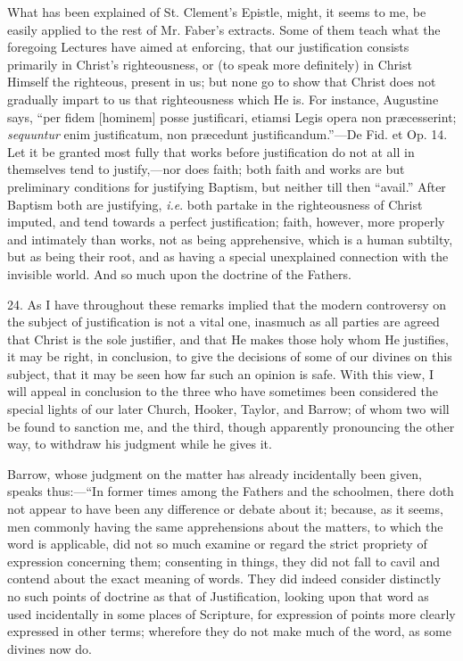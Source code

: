 What has been explained of St. Clement's Epistle, might, it seems
to me, be easily applied to the rest of Mr. Faber's extracts. Some of
them teach what the foregoing Lectures have aimed at enforcing, that
our justification consists primarily in Christ's righteousness, or (to
speak more definitely) in Christ Himself the righteous, present in us;
but none go to show that Christ does not gradually impart to us that
righteousness which He is. For instance, Augustine says, ``per
fidem [hominem] posse justificari, etiamsi Legis opera non
præcesserint; \emph{sequuntur} enim justificatum, non præcedunt
justificandum.''—De Fid. et Op. 14. Let it be granted most fully
that works before justification do not at all in themselves tend to
justify,—nor does faith; both faith and works are but preliminary
conditions for justifying Baptism, but neither till then
``avail.'' After Baptism both are justifying, \emph{i.e}. both
partake in the righteousness of Christ imputed, and tend towards a
perfect justification; faith, however, more properly and intimately
than works, not as being apprehensive, which is a human subtilty, but
as being their root, and as having a special unexplained
connection with the invisible world. And so much upon the doctrine of
the Fathers.

24. As I have throughout these remarks implied that the modern
controversy on the subject of justification is not a vital one,
inasmuch as all parties are agreed that Christ is the sole justifier,
and that He makes those holy whom He justifies, it may be right, in
conclusion, to give the decisions of some of our divines on this
subject, that it may be seen how far such an opinion is safe. With
this view, I will appeal in conclusion to the three who have sometimes
been considered the special lights of our later Church, Hooker,
Taylor, and Barrow; of whom two will be found to sanction me, and the
third, though apparently pronouncing the other way, to withdraw his
judgment while he gives it.

Barrow, whose judgment on the matter has already incidentally been
given, speaks thus:—``In former times among the Fathers and the
schoolmen, there doth not appear to have been any difference or debate
about it; because, as it seems, men commonly having the same
apprehensions about the matters, to which the word is applicable, did
not so much examine or regard the strict propriety of expression
concerning them; consenting in things, they did not fall to cavil and
contend about the exact meaning of words. They did indeed consider
distinctly no such points of doctrine as that of Justification,
looking upon that word as used incidentally in some places of
Scripture, for expression of points more clearly expressed in other
terms; wherefore they do not make much of the word, as some divines
now do.

